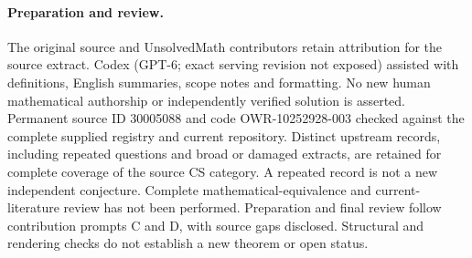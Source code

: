 \documentclass[11pt]{article}
\begin{document}
\paragraph{Preparation and review.}
The original source and UnsolvedMath contributors retain attribution for the source extract. Codex (GPT-6; exact serving revision not exposed) assisted with definitions, English summaries, scope notes and formatting. No new human mathematical authorship or independently verified solution is asserted. Permanent source ID 30005088 and code OWR-10252928-003 checked against the complete supplied registry and current repository. Distinct upstream records, including repeated questions and broad or damaged extracts, are retained for complete coverage of the source CS category. A repeated record is not a new independent conjecture. Complete mathematical-equivalence and current-literature review has not been performed. Preparation and final review follow contribution prompts C and D, with source gaps disclosed. Structural and rendering checks do not establish a new theorem or open status.
\label{end:30005088}
\end{document}

